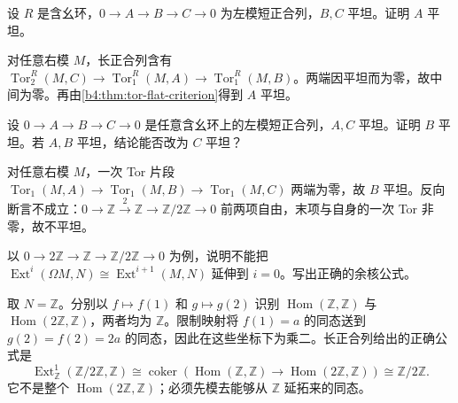 \begin{exercise}\label{b4:ex:08-flat-kernel}
	设 \(R\) 是含幺环，\(0\to A\to B\to C\to0\) 为左模短正合列，\(B,C\) 平坦。证明 \(A\) 平坦。
\end{exercise}
\begin{solution}
	对任意右模 \(M\)，长正合列含有 \(\operatorname{Tor}_2^R(M,C)\to\operatorname{Tor}_1^R(M,A)\to\operatorname{Tor}_1^R(M,B)\)。两端因平坦而为零，故中间为零。再由\cref{b4:thm:tor-flat-criterion}得到 \(A\) 平坦。
\end{solution}

\begin{exercise}\label{b4:ex:08-extension-flat}
	设 \(0\to A\to B\to C\to0\) 是任意含幺环上的左模短正合列，\(A,C\) 平坦。证明 \(B\) 平坦。若 \(A,B\) 平坦，结论能否改为 \(C\) 平坦？
\end{exercise}
\begin{solution}
	对任意右模 \(M\)，一次 Tor 片段 \(\operatorname{Tor}_1(M,A)\to\operatorname{Tor}_1(M,B)\to\operatorname{Tor}_1(M,C)\) 两端为零，故 \(B\) 平坦。反向断言不成立：\(0\to\mathbb Z\xrightarrow2\mathbb Z\to\mathbb Z/2\mathbb Z\to0\) 前两项自由，末项与自身的一次 Tor 非零，故不平坦。
\end{solution}

\begin{exercise}\label{b4:ex:08-zero-degree-shift}
	以 \(0\to2\mathbb Z\to\mathbb Z\to\mathbb Z/2\mathbb Z\to0\) 为例，说明不能把 \(\operatorname{Ext}^i(\Omega M,N)\cong\operatorname{Ext}^{i+1}(M,N)\) 延伸到 \(i=0\)。写出正确的余核公式。
\end{exercise}
\begin{solution}
	取 \(N=\mathbb Z\)。分别以 \(f\mapsto f(1)\) 和 \(g\mapsto g(2)\) 识别 \(\operatorname{Hom}(\mathbb Z,\mathbb Z)\) 与 \(\operatorname{Hom}(2\mathbb Z,\mathbb Z)\)，两者均为 \(\mathbb Z\)。限制映射将 \(f(1)=a\) 的同态送到 \(g(2)=f(2)=2a\) 的同态，因此在这些坐标下为乘二。长正合列给出的正确公式是
	\[
		\operatorname{Ext}^1_{\mathbb Z}(\mathbb Z/2\mathbb Z,\mathbb Z) \cong\operatorname{coker}\!\left( \operatorname{Hom}(\mathbb Z,\mathbb Z)\longrightarrow \operatorname{Hom}(2\mathbb Z,\mathbb Z)\right) \cong\mathbb Z/2\mathbb Z.
	\]
	它不是整个 \(\operatorname{Hom}(2\mathbb Z,\mathbb Z)\)；必须先模去能够从 \(\mathbb Z\) 延拓来的同态。
\end{solution}

